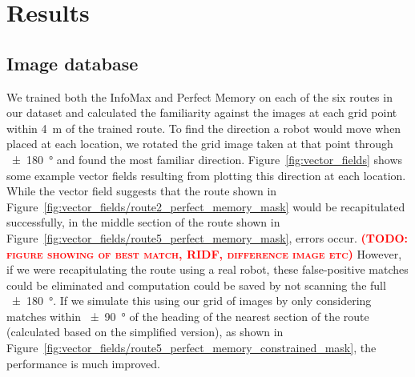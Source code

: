 \documentclass[letterpaper]{article}
\newcommand{\todo}[1]{\textbf{\textsc{\textcolor{red}{(TODO: #1)}}}}
\begin{document}
\section{Results}
\subsection{Image database}
We trained both the InfoMax and Perfect Memory on each of the six routes in our dataset and calculated the familiarity against the images at each grid point within \SI{4}{\metre} of the trained route. 
To find the direction a robot would move when placed at each location, we rotated the grid image taken at that point through \SI{\pm 180}{\degree} and found the most familiar direction. 
Figure~\ref{fig:vector_fields} shows some example vector fields resulting from plotting this direction at each location. 
While the vector field suggests that the route shown in Figure~\ref{fig:vector_fields/route2_perfect_memory_mask} would be recapitulated successfully, in the middle section of the route shown in Figure~\ref{fig:vector_fields/route5_perfect_memory_mask}, errors occur.
\todo{figure showing of best match, RIDF, difference image etc}
However, if we were recapitulating the route using a real robot, these false-positive matches could be eliminated and computation could be saved by not scanning the full \SI{\pm 180}{\degree}. 
If we simulate this using our grid of images by only considering matches within \SI{\pm 90}{\degree} of the heading of the nearest section of the route (calculated based on the simplified version), as shown in Figure~\ref{fig:vector_fields/route5_perfect_memory_constrained_mask}, the performance is much improved.
\end{document}
